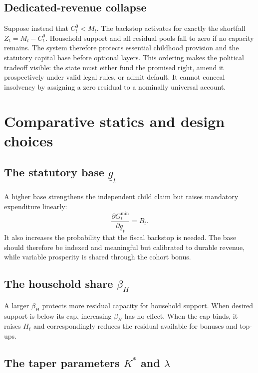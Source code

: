 \documentclass[11pt]{article}
\begin{document}
\subsection{Dedicated-revenue collapse}

Suppose instead that $C_t^0<M_t$. The backstop activates for exactly the shortfall
$Z_t=M_t-C_t^0$. Household support and all residual pools fall to zero if no capacity
remains. The system therefore protects essential childhood provision and the statutory
capital base before optional layers. This ordering makes the political tradeoff visible:
the state must either fund the promised right, amend it prospectively under valid legal
rules, or admit default. It cannot conceal insolvency by assigning a zero residual to a
nominally universal account.

\section{Comparative statics and design choices}

\subsection{The statutory base $\underline g_t$}

A higher base strengthens the independent child claim but raises mandatory expenditure
linearly:
\begin{equation*}
  \frac{\partial G_t^{\min}}{\partial\underline g_t}=B_t.
\end{equation*}
It also increases the probability that the fiscal backstop is needed. The base should
therefore be indexed and meaningful but calibrated to durable revenue, while variable
prosperity is shared through the cohort bonus.

\subsection{The household share $\beta_H$}

A larger $\beta_H$ protects more residual capacity for household support. When desired
support is below its cap, increasing $\beta_H$ has no effect. When the cap binds, it
raises $H_t$ and correspondingly reduces the residual available for bonuses and top-ups.

\subsection{The taper parameters $K^*$ and $\lambda$}
\end{document}
